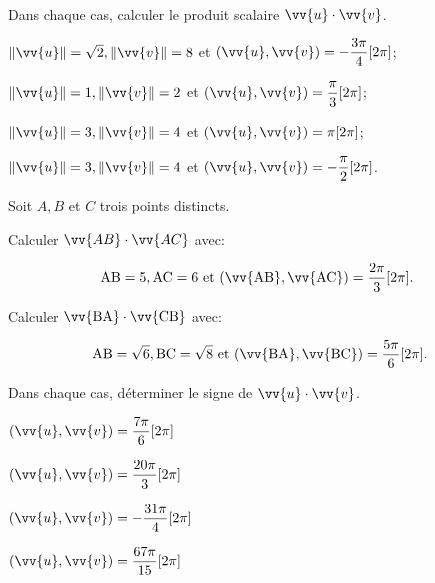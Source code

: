 \documentclass[11pt,a4paper]{article}  %
\begin{document}
	\graphicspath{{images/}}
	
	\begin{center}
		
		
	\end{center}
	
\exercice{} \\
Dans chaque cas, calculer le produit scalaire $\vv{u} \cdot \vv{v}$.
\begin{enumMet}
	\item $\|\vv{u}\|=\sqrt{2},\|\vv{v}\|=8$ et $(\vv{u}, \vv{v})=-\dfrac{3 \pi}{4}[2 \pi]$;
	\item $\|\vv{u}\|=1,\|\vv{v}\|=2$ et $(\vv{u}, \vv{v})=\dfrac{\pi}{3}[2 \pi]$;
	\item $\|\vv{u}\|=3,\|\vv{v}\|=4$ et $(\vv{u}, \vv{v})=\pi[2 \pi]$;
	\item $\|\vv{u}\|=3,\|\vv{v}\|=4$ et $(\vv{u}, \vv{v})=-\dfrac{\pi}{2}[2 \pi]$.
\end{enumMet}

\exercice{}

Soit $A, B$ et $C$ trois points distincts.

\begin{enumMet}
	\item Calculer $\vv{A B} \cdot \vv{A C}$ avec:

$$
\mathrm{AB}=5, \mathrm{AC}=6 \text { et }(\vv{\mathrm{AB}}, \vv{\mathrm{AC}})=\frac{2 \pi}{3}[2 \pi] \text {. }
$$

	\item Calculer $\vv{\mathrm{BA}} \cdot \vv{\mathrm{CB}}$ avec:

$$
\mathrm{AB}=\sqrt{6}, \mathrm{BC}=\sqrt{8} \text { et }(\vv{\mathrm{BA}}, \vv{\mathrm{BC}})=\frac{5 \pi}{6}[2 \pi] .
$$
\end{enumMet}


\exercice{}

Dans chaque cas, déterminer le signe de $\vv{u} \cdot \vv{v}$.
\begin{enumMet}
	\item $(\vv{u}, \vv{v})=\dfrac{7 \pi}{6}[2 \pi]$
	\item $(\vv{u}, \vv{v})=\dfrac{20 \pi}{3}[2 \pi]$
	\item $(\vv{u}, \vv{v})=-\dfrac{31 \pi}{4}[2 \pi]$
	\item $(\vv{u}, \vv{v})=\dfrac{67 \pi}{15}[2 \pi]$
\end{enumMet}
\end{document}
